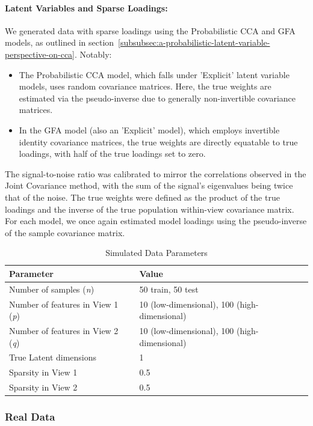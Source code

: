 \paragraph{Latent Variables and Sparse Loadings:}
We generated data with sparse loadings using the Probabilistic CCA and GFA models, as outlined in section~\ref{subsubsec:a-probabilistic-latent-variable-perspective-on-cca}. Notably:
\begin{itemize}
    \item The Probabilistic CCA model, which falls under 'Explicit' latent variable models, uses random covariance matrices. Here, the true weights are estimated via the pseudo-inverse due to generally non-invertible covariance matrices.
    \item In the GFA model (also an 'Explicit' model), which employs invertible identity covariance matrices, the true weights are directly equatable to true loadings, with half of the true loadings set to zero.
\end{itemize}
The signal-to-noise ratio was calibrated to mirror the correlations observed in the Joint Covariance method, with the sum of the signal's eigenvalues being twice that of the noise.
The true weights were defined as the product of the true loadings and the inverse of the true population within-view covariance matrix.
For each model, we once again estimated model loadings using the pseudo-inverse of the sample covariance matrix.

\begin{table}
\centering
\caption{Simulated Data Parameters}
\begin{tabular}{| l | l |}
\hline
\textbf{Parameter} & \textbf{Value} \\
\hline
Number of samples (\textit{n}) & 50 train, 50 test \\
Number of features in View 1 (\textit{p}) & 10 (low-dimensional), 100 (high-dimensional) \\
Number of features in View 2 (\textit{q}) & 10 (low-dimensional), 100 (high-dimensional) \\
True Latent dimensions & 1 \\
Sparsity in View 1 & 0.5 \\
Sparsity in View 2 & 0.5 \\
\hline
\end{tabular}\label{tab:simulated-data-parameters}
\end{table}

\subsubsection{Real Data}

